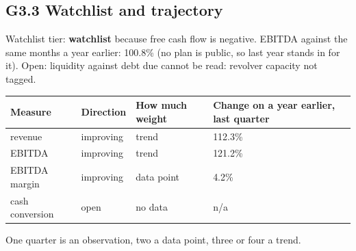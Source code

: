\documentclass[11pt,a4paper]{article}
\begin{document}
\subsection*{G3.3 Watchlist and trajectory}
Watchlist tier: \textbf{watchlist} because free cash flow is negative. EBITDA against the same months a year earlier: 100.8\% (no plan is public, so last year stands in for it). Open: liquidity against debt due cannot be read: revolver capacity not tagged.
\begin{center}\footnotesize\setlength{\tabcolsep}{3.5pt}\begin{tabular}{@{}llll@{}}\toprule
Measure & Direction & How much weight & Change on a year earlier, last quarter \\\midrule
revenue & improving & trend & 112.3\% \\
EBITDA & improving & trend & 121.2\% \\
EBITDA margin & improving & data point & 4.2\% \\
cash conversion & open & no data & n/a \\
\bottomrule\end{tabular}\end{center}
One quarter is an observation, two a data point, three or four a trend.
\end{document}
